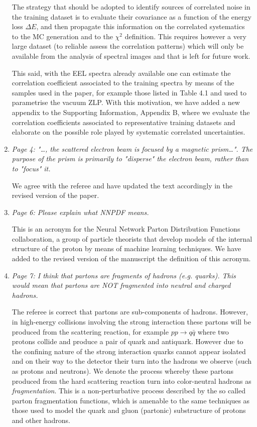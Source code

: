 \documentclass[12pt]{article}
\begin{document}
\begin{enumerate}
  The strategy that should be adopted to identify sources of correlated noise in the training
  dataset is to evaluate their covariance as a function of the energy loss $\Delta E$,
  and then propagate this information on the correlated systematics to the MC generation
  and to the $\chi^2$ definition.
  This requires however a very large dataset (to reliable assess the correlation patterns)
  which will only be available from the analysis of spectral images and that is left for
  future work.

  This said, with the EEL spectra already available one
  can estimate the correlation coefficient associated to the training
  spectra by means of the samples used in the paper, for example those
  listed in Table 4.1 and used to parametrise the vacuum ZLP.
  With this motivation,
  we have added a new appendix to the Supporting Information,
  Appendix B, where
  we evaluate the correlation coefficients associated to representative training datasets and elaborate on the possible role played by systematic correlated uncertainties.


  
  
  
\item {\it	Page 4: "…, the scattered electron beam is focused by a magnetic prism…". The purpose of the prism is primarily to "disperse" the electron beam, rather than to "focus" it. }

We agree with the referee and have updated the text accordingly in the revised version of the paper.

\item {\it	Page 6: Please explain what NNPDF means.}

  This is an acronym for the Neural Network Parton Distribution Functions collaboration, a group
  of particle theorists that develop models of the internal structure of the proton by means
  of machine learning techniques. We have added to the revised version of the manuscript
  the definition of this acronym.
  
\item {\it	Page 7: I think that partons are fragments of hadrons (e.g. quarks). This would mean that partons are NOT fragmented into neutral and charged hadrons.}

  The referee is correct that partons are sub-components of hadrons. However, in high-energy collisions
  involving the strong interaction these partons will be produced from the scattering reaction,
  for example $pp \to q\bar{q}$ where two protons collide and produce a pair of quark and antiquark.
  However due to the confining nature of the strong interaction quarks cannot appear isolated
  and on their way to the detector their turn into the hadrons we observe (such as protons and neutrons).
  We denote the process whereby these partons produced from the hard scattering reaction turn
  into color-neutral hadrons as {\it fragmentation}.
  This is a non-perturbative process described by the so called parton fragmentation functions,
  which is amenable to the same techniques as those used to model the quark and gluon (partonic)
  substructure of protons and other hadrons.


\end{enumerate}
\end{document}
